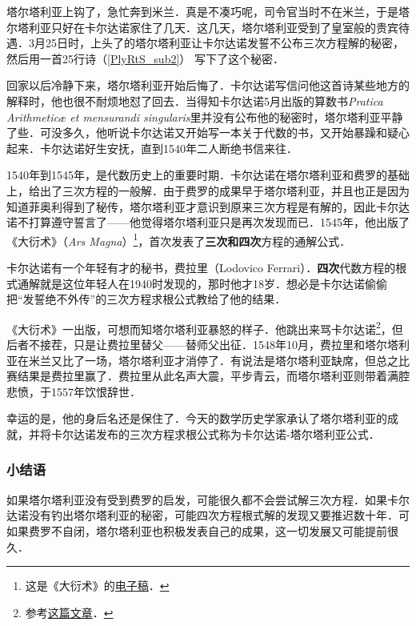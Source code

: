塔尔塔利亚上钩了，急忙奔到米兰．真是不凑巧呢，司令官当时不在米兰，于是塔尔塔利亚只好在卡尔达诺家住了几天．这几天，塔尔塔利亚受到了皇室般的贵宾待遇．3月25日时，上头了的塔尔塔利亚让卡尔达诺发誓不公布三次方程解的秘密，然后用一首25行诗（\autoref{PlyRtS_sub2}） 写下了这个秘密．

回家以后冷静下来，塔尔塔利亚开始后悔了．卡尔达诺写信问他这首诗某些地方的解释时，他也很不耐烦地怼了回去．当得知卡尔达诺5月出版的算数书\textsl{Pratica Arithmeticæ et mensurandi singularis}里并没有公布他的秘密时，塔尔塔利亚平静了些．可没多久，他听说卡尔达诺又开始写一本关于代数的书，又开始暴躁和疑心起来．卡尔达诺好生安抚，直到1540年二人断绝书信来往．

1540年到1545年，是代数历史上的重要时期．卡尔达诺在塔尔塔利亚和费罗的基础上，给出了三次方程的一般解．由于费罗的成果早于塔尔塔利亚，并且也正是因为知道菲奥利得到了秘传，塔尔塔利亚才意识到原来三次方程是有解的，因此卡尔达诺不打算遵守誓言了——他觉得塔尔塔利亚只是再次发现而已．1545年，他出版了《大衍术》（\textsl{Ars Magna}）\footnote{这是《大衍术》的\href{https://web.archive.org/web/20220201093634/http://www.filosofia.unimi.it/cardano/testi/operaomnia/vol_4_s_4.pdf}{电子稿}．}，首次发表了\textbf{三次和四次}方程的通解公式．

卡尔达诺有一个年轻有才的秘书，费拉里（Lodovico Ferrari）．\textbf{四次}代数方程的根式通解就是这位年轻人在1940时发现的，那时他才18岁．想必是卡尔达诺偷偷把“发誓绝不外传”的三次方程求根公式教给了他的结果．

《大衍术》一出版，可想而知塔尔塔利亚暴怒的样子．他跳出来骂卡尔达诺\footnote{参考\href{https://arxiv.org/ftp/arxiv/papers/1308/1308.2181.pdf}{这篇文章}．}，但后者不接茬，只是让费拉里替父——替师父出征．1548年10月，费拉里和塔尔塔利亚在米兰又比了一场，塔尔塔利亚才消停了．有说法是塔尔塔利亚缺席，但总之比赛结果是费拉里赢了．费拉里从此名声大震，平步青云，而塔尔塔利亚则带着满腔悲愤，于1557年饮恨辞世．

幸运的是，他的身后名还是保住了．今天的数学历史学家承认了塔尔塔利亚的成就，并将卡尔达诺发布的三次方程求根公式称为卡尔达诺-塔尔塔利亚公式．






\subsubsection{小结语}

如果塔尔塔利亚没有受到费罗的启发，可能很久都不会尝试解三次方程．如果卡尔达诺没有钓出塔尔塔利亚的秘密，可能四次方程根式解的发现又要推迟数十年．可如果费罗不自闭，塔尔塔利亚也积极发表自己的成果，这一切发展又可能提前很久．

